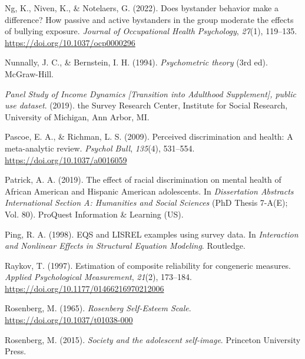 \documentclass[
  man]{apa7}
\newlength{\cslhangindent}
\newlength{\cslentryspacingunit} %
\newenvironment{CSLReferences}[2] %
 {%
  \setlength{\parindent}{0pt}
  \ifodd #1
  \let\oldpar\par
  \def\par{\hangindent=\cslhangindent\oldpar}
  \fi
  \setlength{\parskip}{#2\cslentryspacingunit}
 }%
 {}
\begin{document}
\begin{CSLReferences}{1}{0}
\leavevmode{}%
Ng, K., Niven, K., \& Notelaers, G. (2022). Does bystander behavior make a difference? {How} passive and active bystanders in the group moderate the effects of bullying exposure. \emph{Journal of Occupational Health Psychology}, \emph{27}(1), 119--135. \url{https://doi.org/10.1037/ocp0000296}

\leavevmode{}%
Nunnally, J. C., \& Bernstein, I. H. (1994). \emph{Psychometric theory} (3rd ed). McGraw-Hill.

\leavevmode{}%
\emph{Panel {Study} of {Income Dynamics} {[}{Transition} into {Adulthood Supplement}{]}, public use dataset}. (2019). the Survey Research Center, Institute for Social Research, University of Michigan, Ann Arbor, MI.

\leavevmode{}%
Pascoe, E. A., \& Richman, L. S. (2009). Perceived discrimination and health: {A} meta-analytic review. \emph{Psychol Bull}, \emph{135}(4), 531--554. \url{https://doi.org/10.1037/a0016059}

\leavevmode{}%
Patrick, A. A. (2019). The effect of racial discrimination on mental health of {African American} and {Hispanic American} adolescents. In \emph{Dissertation Abstracts International Section A: Humanities and Social Sciences} (PhD Thesis 7-A(E); Vol. 80). ProQuest Information \& Learning (US).

\leavevmode{}%
Ping, R. A. (1998). {EQS} and {LISREL} examples using survey data. In \emph{Interaction and {Nonlinear Effects} in {Structural Equation Modeling}}. Routledge.

\leavevmode{}%
Raykov, T. (1997). Estimation of composite reliability for congeneric measures. \emph{Applied Psychological Measurement}, \emph{21}(2), 173--184. \url{https://doi.org/10.1177/01466216970212006}

\leavevmode{}%
Rosenberg, M. (1965). \emph{Rosenberg {Self-Esteem Scale}}. \url{https://doi.org/10.1037/t01038-000}

\leavevmode{}%
Rosenberg, M. (2015). \emph{Society and the adolescent self-image}. Princeton University Press.


\end{CSLReferences}
\end{document}
